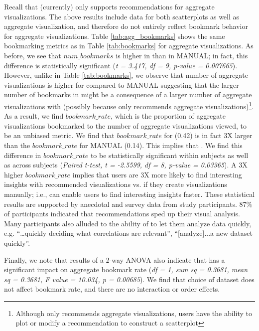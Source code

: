 Recall that \SeeDB (currently) only supports recommendations for aggregate visualizations.
The above results include data for both scatterplots as well as aggregate visualization, and
therefore do not entirely reflect bookmark behavior for aggregate visualizations.
Table \ref{tab:agg_bookmarks} shows the same bookmarking metrics as in Table \ref{tab:bookmarks}
for aggregate visualizations.
As before, we see that $num\_bookmarks$ is higher in \SeeDB than in MANUAL; in fact, this difference
is statistically significant ({\em t = 3.417, df = 9, p-value = 0.007665}).
However, unlike in Table \ref{tab:bookmarks}, we observe that number of aggregate visualizations 
is higher for \SeeDB compared to MANUAL suggesting that the larger number of bookmarks in \SeeDB 
might be a consequence of a larger number of aggregate visualizations with \SeeDB (possibly because
\SeeDB only recommends aggregate visualizations)\footnote{Although \SeeDB only recommends aggregate
visualizations, users have the ability to plot or modify a recommendation to construct a scatterplot}.
As a result, we find $bookmark\_rate$, which is the proportion of aggregate visualizations bookmarked
to the number of aggregate visualizations viewed, to be an unbiased metric.
We find that $bookmark\_rate$ for \SeeDB (0.42) is in fact 3X larger than the $bookmark\_rate$ for 
MANUAL (0.14).
This implies that .
We find this difference in $bookmark\_rate$ to be statistically significant within subjects as well 
as across subjects ({\em Paired t-test, t = -2.5599, df = 8, p-value = 0.03365}).
A 3X higher $bookmark\_rate$ implies that users are 3X more likely to find interesting insights with 
recommended visualizations vs. if they create visualizations manually; i.e., \SeeDB can enable users 
to find interesting insights faster.
These statistical results are supported by anecdotal and survey data from study participants.
87\% of participants indicated that \SeeDB recommendations sped up their visual analysis. 
Many participants also alluded to the ability of \SeeDB to let them analyze data quickly, e.g. 
``\ldots quickly deciding what correlations are relevant'', ``[analyze]...a new dataset quickly''.

Finally, we note that results of a 2-way ANOVA also indicate that \SeeDB has a significant impact on 
aggregate bookmark rate ({\em df = 1, sum sq = 0.3681, mean sq = 0.3681, F value = 10.034, p = 0.00685}). 
We find that choice of dataset does not affect bookmark rate, and there are no interaction or order effects.



